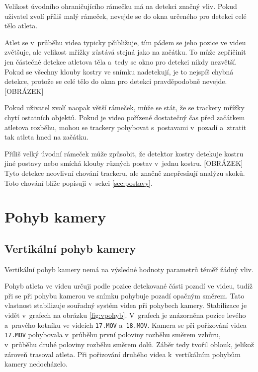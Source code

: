 Velikost úvodního ohraničujícího rámečku má na detekci značný vliv. Pokud uživatel zvolí příliš malý rámeček, nevejde se do okna určeného pro detekci celé tělo atleta.

Atlet se v~průběhu videa typicky pčibližuje, tím pádem se jeho pozice ve videu zvětšuje, ale velikost mřížky zůstává stejná jako na začátku. To může zepříčinit jen částečné detekce atletova těla a~tedy se okno pro detekci nikdy nezvětší. Pokud se všechny klouby kostry ve snímku nadetekují, je to nejspíš chybná detekce, protože se celé tělo do okna pro detekci pravděpodobně nevejde. [OBRÁZEK]

Pokud uživatel zvolí naopak větší rámeček, může se stát, že se trackery mřížky chytí ostatních objektů. Pokud je video pořízené dostatečný čas před začátkem atletova rozběhu, mohou se trackery pohybovat s~postavami v~pozadí a~ztratit tak atleta hned na začátku.

Příliš velký úvodní rámeček může způsobit, že detektor kostry detekuje kostru jiné postavy nebo smíchá klouby různých postav v~jednu kostru. [OBRÁZEK] Tyto detekce neovlivní chování trackeru, ale značně znepřesňují analýzu skoků. Toto chování blíže popisuji v~sekci \ref{sec:postavy}.




\section{Pohyb kamery}

\subsection{Vertikální pohyb kamery}

Vertikální pohyb kamery nemá na výsledné hodnoty parametrů téměř žádný vliv.

Pohyb atleta ve videu určuji podle pozice detekované části pozadí ve videu, tudíž při se při pohybu kamerou ve snímku pohybuje pozadí opačným směrem. Tato vlastnost stabilizuje souřadný systém videa při pohybech kamery. Stabilizace je vidět v~grafech na obrázku \ref{fig:vpohyb}. V~grafech je znázorněna pozice levého a~pravého kotníku ve videích \texttt{17.MOV} a~\texttt{18.MOV}. Kamera se při pořizování videa \texttt{17.MOV} pohybovala v~průběhu první poloviny rozběhu směrem vzhůru, v~průběhu druhé poloviny rozběhu směrem dolů. Záběr tedy tvořil oblouk, jelikož zároveň trasoval atleta. Při pořizování druhého videa k~vertikálním pohybům kamery nedocházelo.

